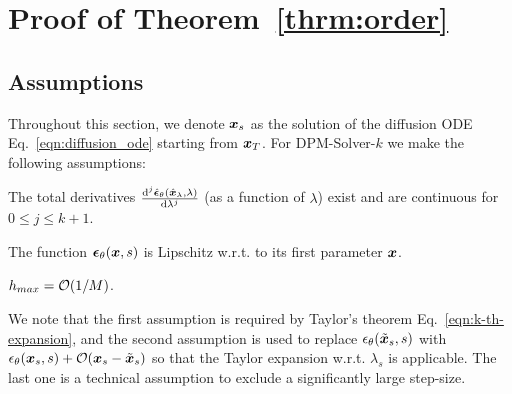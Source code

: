 
\section{Proof of Theorem~\ref{thrm:order}}
\label{appendix:proof}
\subsection{Assumptions}
\label{appendix:assumptions}
Throughout this section, we denote $\bm{x}_s$ as the solution of the diffusion ODE Eq.~\eqref{eqn:diffusion_ode} starting from $\bm{x}_T$.
For DPM-Solver-$k$ we make the following assumptions:
\begin{assumption}
\label{ass:taylor}
The total derivatives $\frac{\dd^j \hat{\bm{\epsilon}}_\theta(\hat{\bm{x}}_\lambda,\lambda)}{\dd\lambda^j}$ (as a function of $\lambda$) exist and are continuous for $0 \leq j \leq k + 1$.
\end{assumption}
\begin{assumption}
\label{ass:lip}
The function $\bm{\epsilon}_\theta(\bm{x}, s)$ is Lipschitz w.r.t. to its first parameter $\bm{x}$.
\end{assumption}
\begin{assumption}
\label{ass:tech-step}
$h_{max} = \mathcal O(1 / M)$.
\end{assumption}

We note that the first assumption is required by Taylor's theorem Eq.~\eqref{eqn:k-th-expansion}, and the second assumption is used to replace $\epsilon_\theta(\tilde {\bm{x}}_s, s)$ with $\epsilon_\theta(\bm{x}_s, s) + \mathcal O( \bm{x}_s - \tilde {\bm{x}}_s )$ so that the Taylor expansion w.r.t. $\lambda_s$ is applicable.
The last one is a technical assumption to exclude a significantly large step-size.


